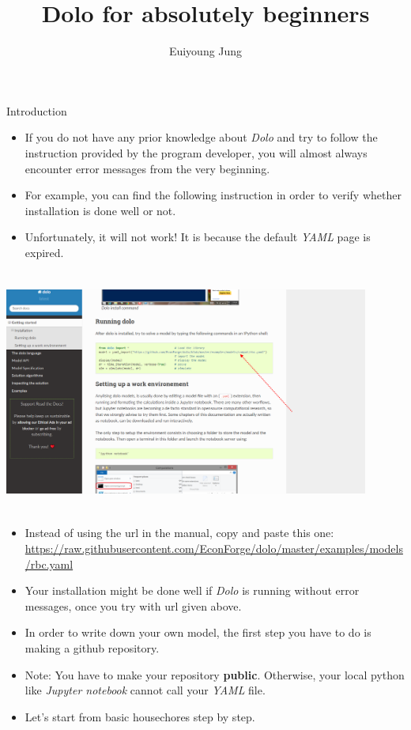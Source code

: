 \documentclass{beamer}
\title{Dolo for absolutely beginners}
\author{Euiyoung Jung}
\institute{PSE}
\date{} %
\begin{document}
{ 
\frame{\titlepage}}


\begin{frame}{Introduction}
    \begin{itemize}
        \item If you do not have any prior knowledge about \textit{Dolo} and try to follow the instruction provided by the program developer, you will almost always encounter error messages from the very beginning. 
        \item For example, you can find the following instruction in order to verify whether installation is done well or not. 
        \item Unfortunately, it will not work! It is because the default \textit{YAML} page is expired.
    \end{itemize}
    \end{frame}
\begin{frame}
     \includegraphics[width=12cm, height= 8cm]{dolo4.png} 
\end{frame}
\begin{frame}
    \begin{itemize}
    \item Instead of using the url in the manual, copy and paste this one: \url{https://raw.githubusercontent.com/EconForge/dolo/master/examples/models/rbc.yaml}  
    \item Your installation might be done well if \textit{Dolo} is running without error messages, once you try with url given above. 
        \item In order to write down your own model, the first step you have to do is making a github repository.
        \item Note: You have to make your repository \textbf{public}. Otherwise, your local python like \textit{Jupyter notebook} cannot call your \textit{YAML} file. 
        \item Let's start from basic housechores step by step. 
    \end{itemize}
\end{frame}
\end{document}
